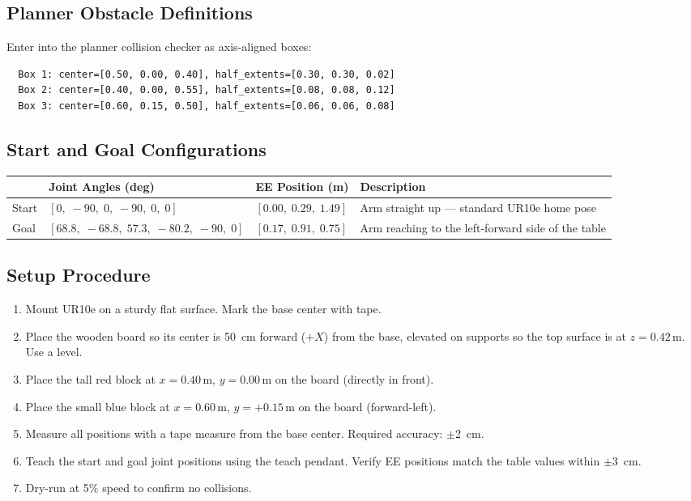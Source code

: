 \documentclass[11pt]{article}
\begin{document}
\subsection{Planner Obstacle Definitions}

Enter into the planner collision checker as axis-aligned boxes:
\begin{verbatim}
  Box 1: center=[0.50, 0.00, 0.40], half_extents=[0.30, 0.30, 0.02]
  Box 2: center=[0.40, 0.00, 0.55], half_extents=[0.08, 0.08, 0.12]
  Box 3: center=[0.60, 0.15, 0.50], half_extents=[0.06, 0.06, 0.08]
\end{verbatim}

\subsection{Start and Goal Configurations}

\begin{table}[h]
\centering
\begin{tabular}{@{}lllp{5cm}@{}}
\toprule
 & Joint Angles (deg) & EE Position (m) & Description \\
\midrule
Start & $[0,\; -90,\; 0,\; -90,\; 0,\; 0]$
      & $[0.00,\; 0.29,\; 1.49]$
      & Arm straight up --- standard UR10e home pose \\[4pt]
Goal  & $[68.8,\; -68.8,\; 57.3,\; -80.2,\; -90,\; 0]$
      & $[0.17,\; 0.91,\; 0.75]$
      & Arm reaching to the left-forward side of the table \\
\bottomrule
\end{tabular}
\end{table}

\subsection{Setup Procedure}

\begin{enumerate}[itemsep=2pt]
  \item Mount UR10e on a sturdy flat surface. Mark the base center with tape.
  \item Place the wooden board so its center is \SI{50}{\centi\meter} forward ($+X$) from the base, elevated on supports so the top surface is at $z = 0.42$\,m. Use a level.
  \item Place the tall red block at $x = 0.40$\,m, $y = 0.00$\,m on the board (directly in front).
  \item Place the small blue block at $x = 0.60$\,m, $y = +0.15$\,m on the board (forward-left).
  \item Measure all positions with a tape measure from the base center. Required accuracy: $\pm$\SI{2}{\centi\meter}.
  \item Teach the start and goal joint positions using the teach pendant. Verify EE positions match the table values within $\pm$\SI{3}{\centi\meter}.
  \item Dry-run at 5\% speed to confirm no collisions.
\end{enumerate}
\end{document}
